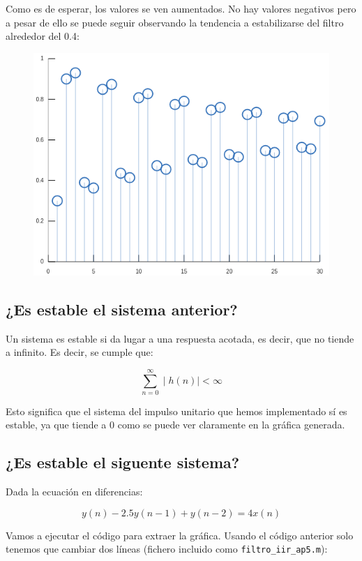 \documentclass[11pt,a4paper]{article}
\begin{document}
Como es de esperar, los valores se ven aumentados. No hay valores negativos pero a pesar de ello se puede seguir observando la tendencia a estabilizarse del filtro alrededor del 0.4:

\begin{figure}[H]
	\centering
	\includegraphics[scale=0.5]{img/iir-escalon.png}
\end{figure}

\subsection{¿Es estable el sistema anterior?}

Un sistema es estable si da lugar a una respuesta acotada, es decir, que no tiende a infinito. Es decir, se cumple que:

\[
	\sum_{n=0}^{\infty}\mid h(n) \mid < \infty
\]

Esto significa que el sistema del impulso unitario que hemos implementado sí es estable, ya que tiende a 0 como se puede ver claramente en la gráfica generada.

\subsection{¿Es estable el siguente sistema?}

Dada la ecuación en diferencias:

\[y(n)-2.5y(n-1)+y(n-2)=4x(n)\]

Vamos a ejecutar el código para extraer la gráfica. Usando el código anterior solo tenemos que cambiar dos líneas (fichero incluido como \texttt{filtro\_iir\_ap5.m}):
\end{document}
